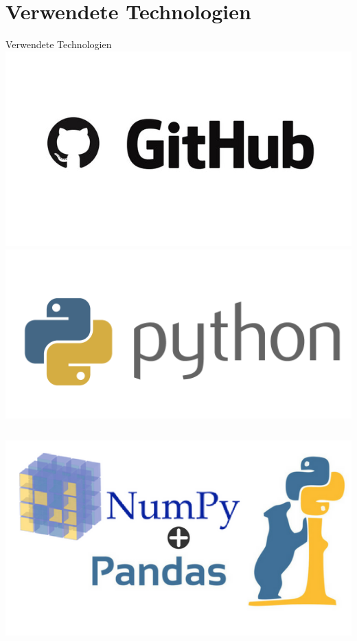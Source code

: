 \documentclass[12pt, xcolor={usenames,dvipsnames,svgnames,x11names,table}]{beamer}
\begin{document}
	\section{Verwendete Technologien}
	\begin{frame}{Verwendete Technologien}{}
		\center
		\includegraphics[scale=.3, clip=true, trim=0mm 40mm 0mm 40mm]{github}\\
		\includegraphics[scale=.15, clip=true, trim=0mm 30mm 0mm 0mm]{python}\hspace{10cm}
		
		\begin{columns}[c, onlytextwidth]
			\begin{column}{.5\textwidth}
				\center \includegraphics[scale=.27]{pandas}
			\end{column}
			

\end{columns}
\end{frame}
\end{document}

